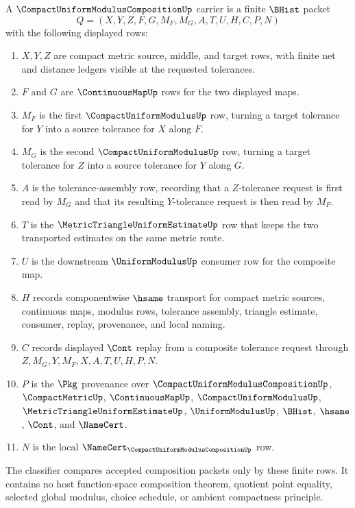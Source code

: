\begin{definition}
\label{def:compact-uniform-modulus-composition-carrier}
A $\CompactUniformModulusCompositionUp$ carrier is a finite $\BHist$ packet
$$
Q=(X,Y,Z,F,G,M_F,M_G,A,T,U,H,C,P,N)
$$
with the following displayed rows:
\begin{enumerate}
\item $X,Y,Z$ are compact metric source, middle, and target rows, with finite net and distance ledgers visible at the requested tolerances.
\item $F$ and $G$ are $\ContinuousMapUp$ rows for the two displayed maps.
\item $M_F$ is the first $\CompactUniformModulusUp$ row, turning a target tolerance for $Y$ into a source tolerance for $X$ along $F$.
\item $M_G$ is the second $\CompactUniformModulusUp$ row, turning a target tolerance for $Z$ into a source tolerance for $Y$ along $G$.
\item $A$ is the tolerance-assembly row, recording that a $Z$-tolerance request is first read by $M_G$ and that its resulting $Y$-tolerance request is then read by $M_F$.
\item $T$ is the $\MetricTriangleUniformEstimateUp$ row that keeps the two transported estimates on the same metric route.
\item $U$ is the downstream $\UniformModulusUp$ consumer row for the composite map.
\item $H$ records componentwise $\hsame$ transport for compact metric sources, continuous maps, modulus rows, tolerance assembly, triangle estimate, consumer, replay, provenance, and local naming.
\item $C$ records displayed $\Cont$ replay from a composite tolerance request through $Z,M_G,Y,M_F,X,A,T,U,H,P,N$.
\item $P$ is the $\Pkg$ provenance over $\CompactUniformModulusCompositionUp$, $\CompactMetricUp$, $\ContinuousMapUp$, $\CompactUniformModulusUp$, $\MetricTriangleUniformEstimateUp$, $\UniformModulusUp$, $\BHist$, $\hsame$, $\Cont$, and $\NameCert$.
\item $N$ is the local $\NameCert_{\CompactUniformModulusCompositionUp}$ row.
\end{enumerate}
The classifier compares accepted composition packets only by these finite rows. It contains no host function-space composition theorem, quotient point equality, selected global modulus, choice schedule, or ambient compactness principle.
\end{definition}

